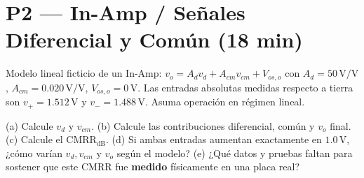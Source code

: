 \documentclass[10pt, a4paper]{article}
\begin{document}
\section*{P2 — In-Amp / Señales Diferencial y Común (18 min)}
Modelo lineal ficticio de un In-Amp: $v_o = A_d v_d + A_{cm} v_{cm} + V_{os,o}$ con $A_d = 50\,\mathrm{V/V}$, $A_{cm} = 0.020\,\mathrm{V/V}$, $V_{os,o} = 0\,\mathrm{V}$. Las entradas absolutas medidas respecto a tierra son $v_+ = 1.512\,\mathrm{V}$ y $v_- = 1.488\,\mathrm{V}$. Asuma operación en régimen lineal.
\begin{center}
\end{center}
(a) Calcule $v_d$ y $v_{cm}$. (b) Calcule las contribuciones diferencial, común y $v_o$ final. (c) Calcule el $\mathrm{CMRR}_{\mathrm{dB}}$. (d) Si ambas entradas aumentan exactamente en $1.0\,\mathrm{V}$, ¿cómo varían $v_d, v_{cm}$ y $v_o$ según el modelo? (e) ¿Qué datos y pruebas faltan para sostener que este CMRR fue \textbf{medido} físicamente en una placa real?
\vspace{2.5cm}
\end{document}
